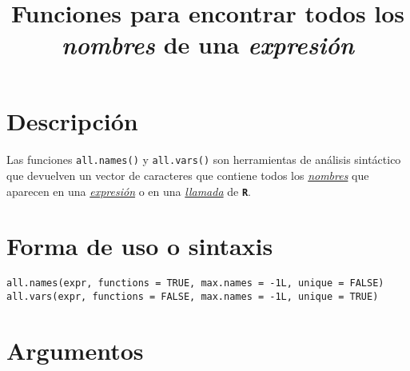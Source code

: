 \documentclass{article}[letter, 12pt]
\makeatletter
\newlength\tindent
\renewcommand{\indent}{\hspace*{\tindent}}
\def\code#1{\texttt{#1}}
\def\codename#1{\textbf{\texttt{\color{gray}#1}}}
\renewcommand{\maketitle}{\bgroup\setlength{\parindent}{0pt}
\begin{flushleft}
  \textbf{\@title}
  \@author
\end{flushleft}\egroup
}
\makeatother
\begin{document}
	\title{\Huge{Funciones para encontrar todos los \textit{nombres} de una \textit{expresión}}}
	\maketitle
	\section{\color{gray}Descripción}
	\paragraph{}
Las funciones \code{all.names()} y \code{all.vars()} son herramientas de análisis sintáctico que devuelven un vector de caracteres que contiene todos los \href{run:/Vocabulary.pdf}{\textit{nombres}} que aparecen en una \href{run:/Vocabulary.pdf}{\textit{expresión}} o en una \href{run:/Vocabulary.pdf}{\textit{llamada}} de \codename{R}.\par
\tableofcontents{}
\section{\color{gray}Forma de uso o sintaxis}
\indent\code{all.names(expr, functions = TRUE, max.names = -1L, unique = FALSE)}\\
\indent\code{all.vars(expr, functions = FALSE, max.names = -1L, unique = TRUE)}\\

\section{\color{gray}Argumentos}
\end{document}

